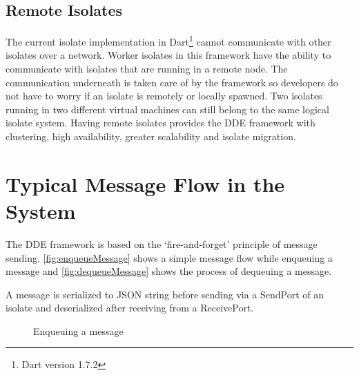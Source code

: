 \subsection{Remote Isolates}
\label{subsec:remoteIsolate}
  The current isolate implementation in Dart\footnote{Dart version 1.7.2} cannot communicate with other isolates over a network. Worker isolates in this framework have the ability to communicate with isolates that are running in a remote node. The communication underneath is taken care of by the framework so developers do not have to worry if an isolate is remotely or locally spawned. Two isolates running in two different virtual machines can still belong to the same logical isolate system. Having remote isolates provides the DDE framework with clustering, high availability, greater scalability and isolate migration.

\section{Typical Message Flow in the System}
The DDE framework is based on the ‘fire-and-forget’ principle of message sending. \autoref{fig:enqueueMessage} shows a simple message flow while enqueuing a message and \autoref{fig:dequeueMessage} shows the process of dequeuing a message.

  A message is serialized to JSON string before sending via a SendPort of an isolate and deserialized after receiving from a ReceivePort.

\begin{figure}[H]
  \centering
  \tiny
\begin{sequencediagram}


\end{sequencediagram}
  \caption{Enqueuing a message}
  \label{fig:enqueueMessage}
\end{figure}
\normalsize

